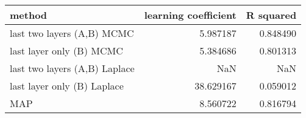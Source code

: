 \begin{tabular}{lrr}
\toprule
                        method &  learning coefficient &  R squared \\
\midrule
    last two layers (A,B) MCMC &              5.987187 &   0.848490 \\
      last layer only (B) MCMC &              5.384686 &   0.801313 \\
 last two layers (A,B) Laplace &                   NaN &        NaN \\
   last layer only (B) Laplace &             38.629167 &   0.059012 \\
                           MAP &              8.560722 &   0.816794 \\
\bottomrule
\end{tabular}

